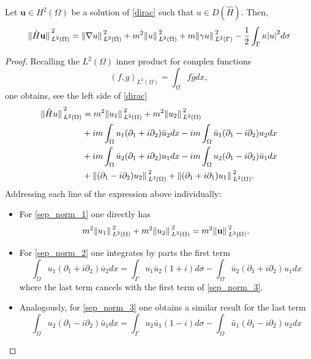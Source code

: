 \begin{lemma}\label{lemma_sep_norm}
    Let \(\mathbf{u} \in H^2(\Omega)\) be a solution of \eqref{dirac} such that \(u \in D(\hat{H})\). Then,
    \begin{equation}\label{sep_norm}
        \norm*{\hat{H}\mathbf{u}}_{L^2(\Omega)}^2 = \norm*{\nabla u }_{L^2(\Omega)}^2 + m^2 \norm*{u}_{L^2(\Omega)}^2 + m \norm*{\gamma u}_{L^2(\Gamma)}^2 -\frac{1}{2}\int_{\Gamma}\kappa \abs{u}^2 d\sigma
    \end{equation}
\end{lemma}
\begin{proof}
    Recalling the \(L^2(\Omega)\) inner product for complex functions
    \[
    (f, g)_{L^2(\Omega)} = \int_\Omega f \bar{g} dx,
    \]
    one obtains, see the left side of \eqref{dirac}
    \begin{align}
        \norm*{\hat{H}u}_{L^2(\Omega)}^2 &= m^2 \norm*{u_1}_{L^2(\Omega)}^2 + m^2 \norm*{u_2}_{L^2(\Omega)}^2 \label{sep_norm_1}\\ 
        & + i m \int_\Omega u_1(\partial_1 + i \partial_2)\bar{u}_2dx - i m \int_\Omega \bar{u}_1(\partial_1 - i \partial_2)u_2 dx \label{sep_norm_2}\\ 
        & + i m \int_\Omega \bar{u}_2(\partial_1 + i \partial_2)u_1 dx - i m \int_\Omega u_2(\partial_1 - i \partial_2)\bar{u}_1 dx \label{sep_norm_3}\\ 
        & +\norm*{(\partial_1 - i \partial_2)u_2}_{L^2(\Omega)}^2 + \norm*{(\partial_1 + i \partial_1)u_1}_{L^2(\Omega)}^2. \label{sep_norm_4}
    \end{align}
    Addressing each line of the expression above individually:
    \begin{itemize}
        \item For \eqref{sep_norm_1} one directly has
                \[
                    m^2 \norm*{u_1}_{L^2(\Omega)}^2 + m^2 \norm*{u_2}_{L^2(\Omega)}^2 = m^2 \norm*{\mathbf{u}}_{L^2(\Omega)}^2.
                \]
        \item For \eqref{sep_norm_2} one integrates by parts the first term
                \[
                \int_\Omega u_1(\partial_1 + i \partial_2)\bar{u}_2dx = \int_{\Gamma} u_1\bar{u}_2(1+i)d\sigma - \int_\Omega \bar{u}_2(\partial_1 + i \partial_2)u_1dx
                \]
            where the last term cancels with the first term of \eqref{sep_norm_3}.
        \item Analogously, for \eqref{sep_norm_3} one obtains a similar result for the last term
                \[
                \int_\Omega u_2(\partial_1 - i \partial_2)\bar{u}_1dx = \int_{\Gamma} u_2\bar{u}_1(1-i)d\sigma - \int_\Omega \bar{u}_1(\partial_1 - i \partial_2)u_2dx 
\]
\end{itemize}
\end{proof}
